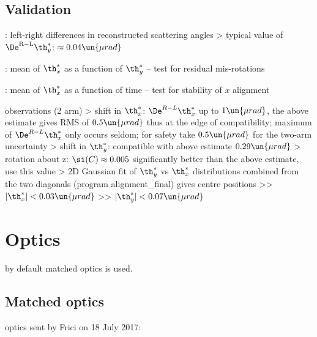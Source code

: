 \section[alignment-val]{Validation}

\> : left-right differences in reconstructed scattering angles
\>> typical value of $\De^{\rm R-L}\th^*_y$: $\approx 0.04\un{\mu rad}$

\> : mean of $\th_x^*$ as a function of $\th_y^*$ -- test for residual mis-rotations

\> :  mean of $\th_x^*$ as a function of time -- test for stability of $x$ alignment

\> observations (2 arm)
\>> shift in $\th_x^*$: $\De^{R-L} \th_x^*$ up to $1\un{\mu rad}$, the above estimate gives RMS of $0.5\un{\mu rad}$ thus at the edge of compatibility; maximum of $\De^{R-L} \th_x^*$ only occurs seldom; for safety take $0.5\un{\mu rad}$ for the two-arm uncertainty
\>> shift in $\th_y^*$: compatible with above estimate $0.29\un{\mu rad}$
\>> rotation about z: $\si(C) \approx 0.005$ significantly better than the above estimate, use this value
\>> 2D Gaussian fit of $\th^*_y$ vs $\th^*_x$ distributions combined from the two diagonals (program alignment\_final) gives centre positions
\>>> $|\th^*_x| < 0.03\un{\mu rad}$
\>>> $|\th^*_y| < 0.07\un{\mu rad}$



\chapter[optics]{Optics}

\> by default matched optics is used.

\section[optics-matched]{Matched optics}

\> optics sent by Frici on 18 July 2017:

\centerline{\vbox{}}

